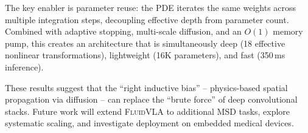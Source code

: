 \documentclass{article}
\newcommand{\fluidvla}{\textsc{FluidVLA}}
\begin{document}
The key enabler is parameter reuse: the PDE iterates the same weights across multiple integration steps, decoupling effective depth from parameter count. Combined with adaptive stopping, multi-scale diffusion, and an $O(1)$ memory pump, this creates an architecture that is simultaneously deep (18 effective nonlinear transformations), lightweight (16K parameters), and fast (350\,ms inference).

These results suggest that the ``right inductive bias'' -- physics-based spatial propagation via diffusion -- can replace the ``brute force'' of deep convolutional stacks. Future work will extend \fluidvla{} to additional MSD tasks, explore systematic scaling, and investigate deployment on embedded medical devices.



\end{document}
